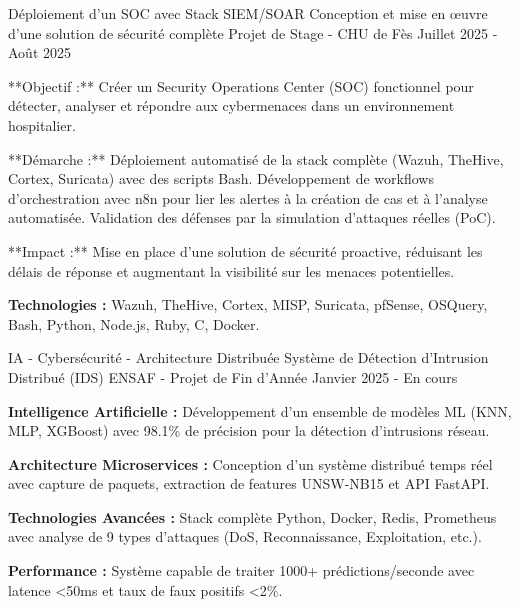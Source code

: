 
\begin{cventries}

  \cventry
  {Déploiement d'un SOC avec Stack SIEM/SOAR}
  {Conception et mise en œuvre d'une solution de sécurité complète} %
  {Projet de Stage - CHU de Fès} %
  {Juillet 2025 - Août 2025} %
  {
    \begin{cvitems}
      \item {**Objectif :** Créer un Security Operations Center (SOC) fonctionnel pour détecter, analyser et répondre aux cybermenaces dans un environnement hospitalier.}
      \item {**Démarche :** Déploiement automatisé de la stack complète (Wazuh, TheHive, Cortex, Suricata) avec des scripts Bash. Développement de workflows d'orchestration avec n8n pour lier les alertes à la création de cas et à l'analyse automatisée. Validation des défenses par la simulation d'attaques réelles (PoC).}
      \item {**Impact :** Mise en place d'une solution de sécurité proactive, réduisant les délais de réponse et augmentant la visibilité sur les menaces potentielles.}
      \item {\textbf{Technologies :} Wazuh, TheHive, Cortex, MISP, Suricata, pfSense, OSQuery, Bash, Python, Node.js, Ruby, C, Docker.}
    \end{cvitems}
  }
  \cventry
  {IA - Cybersécurité - Architecture Distribuée}
  {Système de Détection d'Intrusion Distribué (IDS)} %
  {ENSAF - Projet de Fin d'Année} %
  {Janvier 2025 - En cours} %
  {
    \begin{cvitems} %
      \item {
                  \textbf{Intelligence Artificielle :}
                  Développement d'un ensemble de modèles ML (KNN, MLP, XGBoost) avec 98.1\% de précision pour la détection d'intrusions réseau.}
      \item {
                  \textbf{Architecture Microservices :}
                  Conception d'un système distribué temps réel avec capture de paquets, extraction de features UNSW-NB15 et API FastAPI.}
      \item {
                  \textbf{Technologies Avancées :}
                  Stack complète Python, Docker, Redis, Prometheus avec analyse de 9 types d'attaques (DoS, Reconnaissance, Exploitation, etc.).}
      \item {
                  \textbf{Performance :}
                  Système capable de traiter 1000+ prédictions/seconde avec latence <50ms et taux de faux positifs <2\%.}
    \end{cvitems}
  }


\end{cventries}
